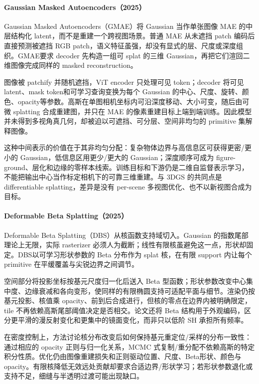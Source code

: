 \paragraph{Gaussian Masked Autoencoders（2025）\cite{2501_03229}}
Gaussian Masked Autoencoders（GMAE）将 Gaussian 当作单张图像 MAE 的中层结构化 latent，而不是重建一个跨视图场景。普通 MAE 从未遮挡 patch 编码后直接预测被遮挡 RGB patch，语义特征虽强，却没有显式的层、尺度或深度组织。GMAE要求 decoder 先构造一组可 splat 的三维 Gaussian，再把它们渲回二维图像完成同样的 masked reconstruction。

图像被 patchify 并随机遮挡，ViT encoder 只处理可见 token；decoder 将可见 latent、mask token和可学习查询变换为每个 Gaussian 的中心、尺度、旋转、颜色、opacity等参数。高斯在单图相机坐标内可沿深度移动、大小可变，随后由可微 splatting 合成重建图，并只在 MAE 的像素重建目标上端到端训练。因此模型并未得到多视角真几何，却被迫以可遮挡、可分层、空间非均匀的 primitive 集解释图像。

这种中间表示的价值在于其非均匀分配：复杂物体边界与高信息区可获得更密/更小的 Gaussian，低信息区用更少/更大的 Gaussian；深度顺序可成为 figure-ground、层化和边缘的零样本线索。训练目标和下游仍是二维自监督表示学习，不能把输出中心当作标定相机下的可靠三维重建。与 3DGS 的共同点是 differentiable splatting，差异是没有 per-scene 多视图优化、也不以新视图合成为目标。

\paragraph{Deformable Beta Splatting（2025）\cite{2501_18630}}
Deformable Beta Splatting（DBS）从核函数支持域切入。Gaussian 的指数尾部理论上无限，实际 rasterizer 必须人为截断；线性有限核虽避免这一点，形状却固定。DBS以可学习形状参数的 Beta 分布作为 splat 核，在有限 support 内让每个 primitive 在平缓覆盖与尖锐边界之间调节。

空间部分将投影坐标按基元尺度归一化后送入 Beta 型函数；形状参数改变中心集中度、边缘衰减和各向变形，使同样的有限椭圆支持可适配平面与细节。渲染仍按基元投影、核值乘 opacity、前到后合成进行，但核的零点在边界内被明确限定，tile 不再依赖高斯尾部阈值决定是否相交。论文还将 Beta 结构用于外观编码，区分更平滑的漫反射变化和更集中的镜面变化，而非只以低阶 SH 承担所有频率。

在密度控制上，方法讨论核分布改变后如何保持基元重定位/采样的分布一致性：通过相应的 opacity 正则与归一化关系，MCMC 式复制/重分配不依赖高斯的特定积分性质。优化仍由图像重建损失和正则驱动位置、尺度、Beta形状、颜色与opacity。有限核降低无效远处贡献却要求合适边界/形状学习；若形状参数退化或支持不足，细缝与半透明过渡可能出现缺口。

